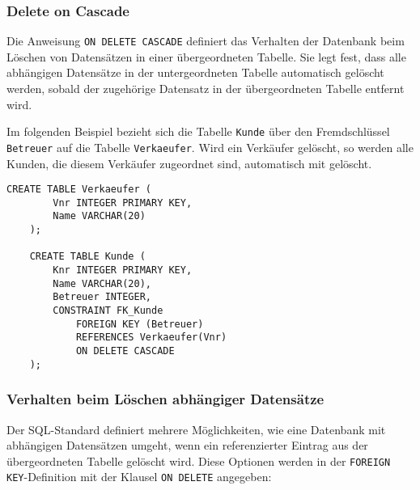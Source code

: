 \subsubsection{Delete on Cascade}
    Die Anweisung \texttt{ON DELETE CASCADE} definiert das Verhalten der Datenbank beim Löschen von Datensätzen in einer übergeordneten Tabelle.
    Sie legt fest, dass alle abhängigen Datensätze in der untergeordneten Tabelle automatisch gelöscht werden, 
    sobald der zugehörige Datensatz in der übergeordneten Tabelle entfernt wird.

    Im folgenden Beispiel bezieht sich die Tabelle \texttt{Kunde} über den Fremdschlüssel \texttt{Betreuer} auf die Tabelle \texttt{Verkaeufer}.
    Wird ein Verkäufer gelöscht, so werden alle Kunden, die diesem Verkäufer zugeordnet sind, automatisch mit gelöscht.

    \begin{lstlisting}[style=sqlstyle]
    CREATE TABLE Verkaeufer (
        Vnr INTEGER PRIMARY KEY,
        Name VARCHAR(20)
    );

    CREATE TABLE Kunde (
        Knr INTEGER PRIMARY KEY,
        Name VARCHAR(20),
        Betreuer INTEGER,
        CONSTRAINT FK_Kunde
            FOREIGN KEY (Betreuer)
            REFERENCES Verkaeufer(Vnr)
            ON DELETE CASCADE
    );
    \end{lstlisting}

    \subsubsection{Verhalten beim Löschen abhängiger Datensätze}

Der SQL-Standard definiert mehrere Möglichkeiten, wie eine Datenbank mit 
abhängigen Datensätzen umgeht, wenn ein referenzierter Eintrag aus der übergeordneten Tabelle gelöscht wird. 
Diese Optionen werden in der \texttt{FOREIGN KEY}-Definition mit der Klausel \texttt{ON DELETE} angegeben:

